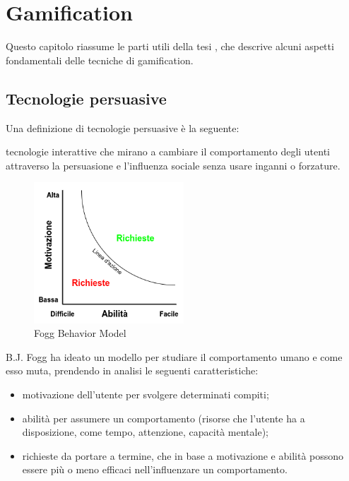 \chapter{Gamification\label{sec:gamification}}


Questo capitolo riassume le parti utili della tesi \parencite{segato:tesi}, che descrive alcuni aspetti fondamentali delle tecniche di gamification.

\section{Tecnologie persuasive\label{sec:tecnologie-persuasive}}

Una definizione di tecnologie persuasive è la seguente:
\begin{quoting}
    \omissis tecnologie interattive che mirano a cambiare il comportamento degli utenti attraverso la persuasione e l'influenza sociale senza usare inganni o forzature. \omissis
\end{quoting}

\begin{figure}[htp]
    \centering
    \includegraphics[width=0.5\textwidth]{immagini/Fogg_behavior_model.png}
    \caption{Fogg Behavior Model}
    \label{fig:fogg-behavior-model}
\end{figure}

B.J. Fogg ha ideato un modello per studiare il comportamento umano e come esso muta, prendendo in analisi le seguenti caratteristiche:
\begin{itemize}
    \item motivazione dell'utente per svolgere determinati compiti;
    \item abilità per assumere un comportamento (risorse che l'utente ha a disposizione, come tempo, attenzione, capacità mentale);
    \item richieste da portare a termine, che in base a motivazione e abilità possono essere più o meno efficaci nell'influenzare un comportamento.
\end{itemize}

